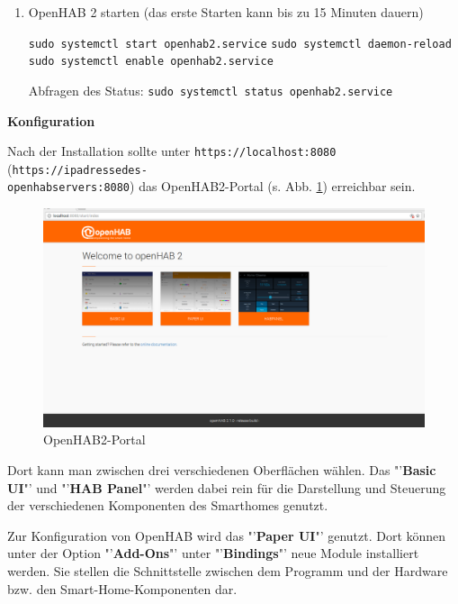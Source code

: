 \begin{enumerate}
	\item OpenHAB 2 starten (das erste Starten kann bis zu 15 Minuten dauern)
	
	\texttt{sudo systemctl start openhab2.service}\newline
	\texttt{sudo systemctl daemon-reload}\newline
	\texttt{sudo systemctl enable openhab2.service}\newline
	
	Abfragen des Status:\newline
	\texttt{sudo systemctl status openhab2.service}
	
\end{enumerate}

\newpage

\textbf{Konfiguration}

Nach der Installation sollte unter \texttt{https://localhost:8080} (\texttt{https://ipadressedes-\\openhabservers:8080}) das OpenHAB2-Portal (s. Abb. \ref{fig:ohportal}) erreichbar sein.

\begin{figure}[H]
	\centering
	\includegraphics[width=1\textwidth]{Bilder/ohPortal}
	\caption{OpenHAB2-Portal}
	\label{fig:ohportal}
\end{figure}

Dort kann man zwischen drei verschiedenen Oberflächen wählen. Das "'\textbf{Basic UI}"' und "'\textbf{HAB Panel}"' werden dabei rein für die Darstellung und Steuerung der verschiedenen Komponenten des Smarthomes genutzt.

Zur Konfiguration von OpenHAB wird das "'\textbf{Paper UI}"' genutzt.
Dort können unter der Option "'\textbf{Add-Ons}"' unter "'\textbf{Bindings}"' neue Module installiert werden. Sie stellen die Schnittstelle zwischen dem Programm und der Hardware bzw. den Smart-Home-Komponenten dar.\newline


